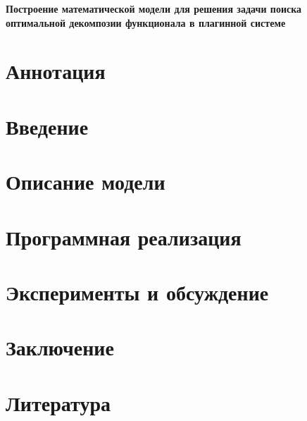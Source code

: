 \documentclass{article}
\begin{document}
    \begin{center}
    \Large
    \textbf{Построение математической модели для решения задачи поиска оптимальной декомпозии функционала в плагинной системе}
    \end{center}

    \section*{Аннотация}
    

    \section*{Введение}
    

    \section*{Описание модели}
    

    \section*{Программная реализация}
    

    \section*{Эксперименты и обсуждение}
    

    \section*{Заключение}
    

    \section*{Литература}
    
\end{document}
